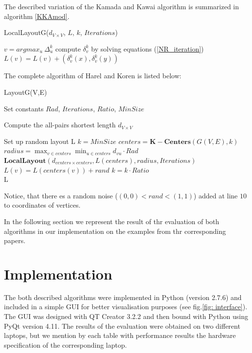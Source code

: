 \documentclass[12pt,a4paper]{article}
\begin{document}
The described variation of the Kamada and Kawai algorithm is summarized in algorithm \ref{KKAmod}.

\begin{algorithm}
\caption{LocalLayoutG($d_{V\times V}$, $L$, $k$, $Iterations$) \cite{DavidHarel2002}}
\label{KKAmod}
\begin{algorithmic}[1]
	\State $v = argmax_{u}\ \Delta^k_u$
	\State compute $\delta^k_v$ by solving equations (\ref{NR_iteration})
	\State $L(v)=L(v) + (\delta^k_v(x), \delta^k_v(y))$
\EndFor
\end{algorithmic}
\end{algorithm}

\FloatBarrier 

The complete algorithm of Harel and Koren is listed below:

\begin{algorithm}
\caption{LayoutG(V,E) \cite{DavidHarel2002}}
\label{HK}
\begin{algorithmic}[1]
\item Set constants $Rad$, $Iterations$, $Ratio$, $MinSize$
\item Compute the all-pairs shortest length $d_{V\times V}$
\item Set up random layout L
\State $ k = MinSize $
	\State $ centers =  \mathbf{K-Centers}(G(V,E),k) $
	\State $ radius =  \max_{v\in centers}\min_{u\in centers}d_{vu} \cdot Rad $	
	\State $\mathbf{LocalLayout}(d_{centers\times centers}, L(centers), radius, Iterations)$
		\State $L(v)=L(centers(v))+rand$
	\EndFor
	\State $k = k \cdot Ratio$
\EndWhile \\
\Return L
\end{algorithmic}
\end{algorithm}

Notice, that there es a random noise ($(0,0)<rand<(1,1)$) added at line $10$ to coordinates of vertices.

In the following section we represent the result of thr evaluation of both algorithms in our implementation on the examples from thr corresponding papers.

\section{Implementation}
The both described algorithms were implemented in Python (version 2.7.6) and included in a simple GUI for better visualisation purposes (see fig.\ref{fig: interface}). The GUI was designed with QT Creator 3.2.2 and then bound with Python using PyQt version 4.11. The results of the  evaluation were obtained on two different laptops, but we mention by each table with performance results the hardware specification of the corresponding laptop.
\end{document}
